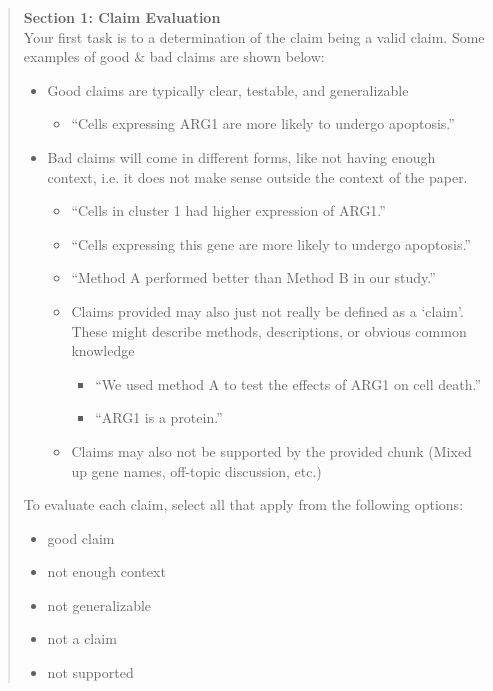 \documentclass{article}
\begin{document}
\begin{quote}
\textbf{Section 1: Claim Evaluation}\\
Your first task is to a determination of the claim being a valid claim. Some examples of good \& bad claims are shown below:
\begin{itemize}
    \item Good claims are typically clear, testable, and generalizable
    \begin{itemize}
        \item ``Cells expressing ARG1 are more likely to undergo apoptosis.''
    \end{itemize}
    \item Bad claims will come in different forms, like not having enough context, i.e. it does not make sense outside the context of the paper.
    \begin{itemize}
        \item ``Cells in cluster 1 had higher expression of ARG1.''
        \item ``Cells expressing this gene are more likely to undergo apoptosis.''
        \item ``Method A performed better than Method B in our study.''
        \item Claims provided may also just not really be defined as a `claim'. These might describe methods, descriptions, or obvious common knowledge
            \begin{itemize}
                \item ``We used method A to test the effects of ARG1 on cell death.''
                \item ``ARG1 is a protein.''
            \end{itemize}
        \item Claims may also not be supported by the provided chunk (Mixed up gene names, off-topic discussion, etc.)
    \end{itemize}
\end{itemize}
To evaluate each claim, select all that apply from the following options:
\begin{itemize}
    \item good claim
    \item not enough context
    \item not generalizable
    \item not a claim
    \item not supported
\end{itemize}


\end{quote}
\end{document}
